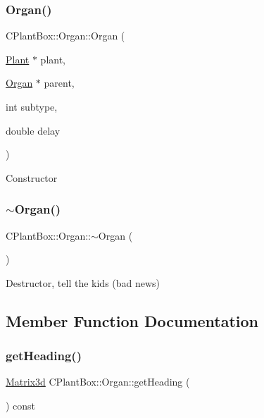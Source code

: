 \subsubsection{\texorpdfstring{Organ()}{Organ()}}
{\footnotesize\ttfamily C\+Plant\+Box\+::\+Organ\+::\+Organ (\begin{DoxyParamCaption}\item[{\hyperlink{classCPlantBox_1_1Plant}{Plant} $\ast$}]{plant,  }\item[{\hyperlink{classCPlantBox_1_1Organ}{Organ} $\ast$}]{parent,  }\item[{int}]{subtype,  }\item[{double}]{delay }\end{DoxyParamCaption})}

Constructor \mbox{\label{classCPlantBox_1_1Organ_a0c6757c6789c3508696ce3253f81aaa3}} 
\subsubsection{\texorpdfstring{$\sim$\+Organ()}{~Organ()}}
{\footnotesize\ttfamily C\+Plant\+Box\+::\+Organ\+::$\sim$\+Organ (\begin{DoxyParamCaption}{ }\end{DoxyParamCaption})\hspace{0.3cm}{\ttfamily [virtual]}}

Destructor, tell the kids (bad news) 

\subsection{Member Function Documentation}
\mbox{\label{classCPlantBox_1_1Organ_a3436c97a754ba2b8633e0f47df3604d5}} 
\subsubsection{\texorpdfstring{get\+Heading()}{getHeading()}}
{\footnotesize\ttfamily \hyperlink{classCPlantBox_1_1Matrix3d}{Matrix3d} C\+Plant\+Box\+::\+Organ\+::get\+Heading (\begin{DoxyParamCaption}{ }\end{DoxyParamCaption}) const}



